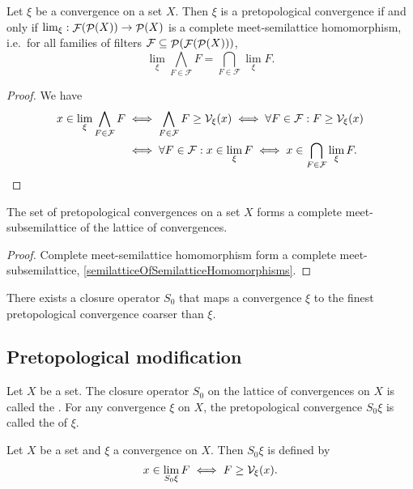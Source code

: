 \begin{proposition}
Let $\xi$ be a convergence on a set $X$. Then $\xi$ is a pretopological convergence \textup{if and only if} $\lim_\xi: \mathop{\mathcal{F}}(\mathop{\mathcal{P}}(X))\to \mathop{\mathcal{P}}(X)$ is a complete meet-semilattice homomorphism, i.e.\
for all families of filters $\mathcal{F} \subseteq \mathop{\mathcal{P}}(\mathop{\mathcal{F}}(\mathop{\mathcal{P}}(X)))$,
\[ \lim_\xi \bigwedge_{F\in \mathcal{F}}F = \bigcap_{F\in\mathcal{F}}\lim_\xi F. \] 
\end{proposition}
\begin{proof}
We have
\begin{align*}
x\in \lim_\xi \bigwedge_{F\in \mathcal{F}}F &\iff \bigwedge_{F\in \mathcal{F}}F \geq \mathcal{V}_\xi(x) \iff \forall F\in\mathcal{F}: F\geq \mathcal{V}_\xi(x) \\
&\iff \forall F\in \mathcal{F}: x\in\lim_\xi F \iff x\in \bigcap_{F\in\mathcal{F}}\lim_\xi F.
\end{align*}
\end{proof}
\begin{corollary}
The set of pretopological convergences on a set $X$ forms a complete meet-subsemilattice of the lattice of convergences.
\end{corollary}
\begin{proof}
Complete meet-semilattice homomorphism form a complete meet-subsemilattice, \ref{semilatticeOfSemilatticeHomomorphisms}.
\end{proof}
\begin{corollary}
There exists a closure operator $S_0$ that maps a convergence $\xi$ to the finest pretopological convergence coarser than $\xi$.
\end{corollary}

\subsection{Pretopological modification}
\begin{definition}
Let $X$ be a set. The closure operator $S_0$ on the lattice of convergences on $X$ is called the . For any convergence $\xi$ on $X$, the pretopological convergence $S_0\xi$ is called the  of $\xi$.
\end{definition}

\begin{proposition}
Let $X$ be a set and $\xi$ a convergence on $X$. Then $S_0\xi$ is defined by
\[ x\in \lim_{S_0\xi} F \iff F \geq \mathcal{V}_\xi(x). \]
\end{proposition}

